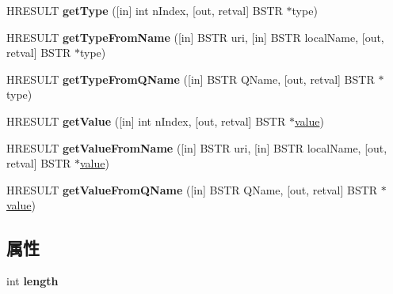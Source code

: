 \begin{DoxyCompactItemize}
H\+R\+E\+S\+U\+LT {\bfseries get\+Type} (\mbox{[}in\mbox{]} int n\+Index, \mbox{[}out, retval\mbox{]} B\+S\+TR $\ast$type)
\item 
\mbox{\label{interface_m_s_x_m_l2_1_1_i_v_b_s_a_x_attributes_a55b69be2554afee12c5fc0f046399478}} 
H\+R\+E\+S\+U\+LT {\bfseries get\+Type\+From\+Name} (\mbox{[}in\mbox{]} B\+S\+TR uri, \mbox{[}in\mbox{]} B\+S\+TR local\+Name, \mbox{[}out, retval\mbox{]} B\+S\+TR $\ast$type)
\item 
\mbox{\label{interface_m_s_x_m_l2_1_1_i_v_b_s_a_x_attributes_a3b90587d1748c98bc219044f2137ab3b}} 
H\+R\+E\+S\+U\+LT {\bfseries get\+Type\+From\+Q\+Name} (\mbox{[}in\mbox{]} B\+S\+TR Q\+Name, \mbox{[}out, retval\mbox{]} B\+S\+TR $\ast$type)
\item 
\mbox{\label{interface_m_s_x_m_l2_1_1_i_v_b_s_a_x_attributes_a8b181c19910c7782c0c7af280e0c53ad}} 
H\+R\+E\+S\+U\+LT {\bfseries get\+Value} (\mbox{[}in\mbox{]} int n\+Index, \mbox{[}out, retval\mbox{]} B\+S\+TR $\ast$\hyperlink{unionvalue}{value})
\item 
\mbox{\label{interface_m_s_x_m_l2_1_1_i_v_b_s_a_x_attributes_a55341240b3ee14099a30778c725892cc}} 
H\+R\+E\+S\+U\+LT {\bfseries get\+Value\+From\+Name} (\mbox{[}in\mbox{]} B\+S\+TR uri, \mbox{[}in\mbox{]} B\+S\+TR local\+Name, \mbox{[}out, retval\mbox{]} B\+S\+TR $\ast$\hyperlink{unionvalue}{value})
\item 
\mbox{\label{interface_m_s_x_m_l2_1_1_i_v_b_s_a_x_attributes_a5d12838d49c43aa60cdfb945c32debea}} 
H\+R\+E\+S\+U\+LT {\bfseries get\+Value\+From\+Q\+Name} (\mbox{[}in\mbox{]} B\+S\+TR Q\+Name, \mbox{[}out, retval\mbox{]} B\+S\+TR $\ast$\hyperlink{unionvalue}{value})
\end{DoxyCompactItemize}
\subsection*{属性}
\begin{DoxyCompactItemize}
\item 
\mbox{\label{interface_m_s_x_m_l2_1_1_i_v_b_s_a_x_attributes_a88e7e6ec231b155e9c5b7558c3940f82}} 
int {\bfseries length}
\end{DoxyCompactItemize}
